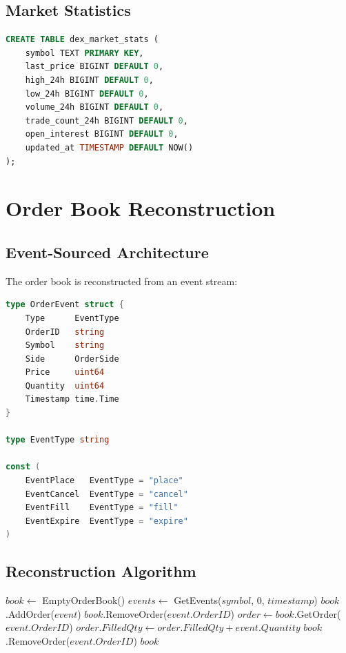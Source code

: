 \documentclass[11pt,twocolumn]{article}
\begin{document}
\subsection{Market Statistics}

\begin{lstlisting}[language=SQL,caption={Market statistics schema}]
CREATE TABLE dex_market_stats (
    symbol TEXT PRIMARY KEY,
    last_price BIGINT DEFAULT 0,
    high_24h BIGINT DEFAULT 0,
    low_24h BIGINT DEFAULT 0,
    volume_24h BIGINT DEFAULT 0,
    trade_count_24h BIGINT DEFAULT 0,
    open_interest BIGINT DEFAULT 0,
    updated_at TIMESTAMP DEFAULT NOW()
);
\end{lstlisting}

\section{Order Book Reconstruction}

\subsection{Event-Sourced Architecture}

The order book is reconstructed from an event stream:

\begin{lstlisting}[language=Go,caption={Order book event types}]
type OrderEvent struct {
    Type      EventType
    OrderID   string
    Symbol    string
    Side      OrderSide
    Price     uint64
    Quantity  uint64
    Timestamp time.Time
}

type EventType string

const (
    EventPlace   EventType = "place"
    EventCancel  EventType = "cancel"
    EventFill    EventType = "fill"
    EventExpire  EventType = "expire"
)
\end{lstlisting}

\subsection{Reconstruction Algorithm}

\begin{algorithm}
\caption{Order Book Reconstruction}
\begin{algorithmic}[1]
    \State $book \gets$ EmptyOrderBook()
    \State $events \gets$ GetEvents($symbol$, 0, $timestamp$)
                \State $book$.AddOrder($event$)
            \EndCase
                \State $book$.RemoveOrder($event.OrderID$)
            \EndCase
                \State $order \gets book$.GetOrder($event.OrderID$)
                \State $order.FilledQty \gets order.FilledQty + event.Quantity$
                    \State $book$.RemoveOrder($event.OrderID$)
                \EndIf
            \EndCase
        \EndSwitch
    \EndFor
    \State \Return $book$
\EndProcedure
\end{algorithmic}
\end{algorithm}
\end{document}
